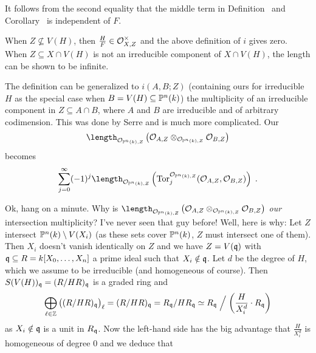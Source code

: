 \documentclass[a4paper,parskip=half,numbers=enddot, DIV=12, headheight=30pt]{scrreprt}
\begin{document}
\begin{rem}
    \begin{alphanumerate}
    \item {}
        It follows from the second equality that the middle term in Definition~ and Corollary~ is independent of $F$.
    \item 
        When $Z\not\subseteq V(H)$, then $\frac{H}{F}\in \mathcal{O}_{X,Z}^\times$ and the above definition of $i$ gives zero. When $Z\subseteq X\cap V(H)$ is not an irreducible component of $X\cap V(H)$, the length can be shown to be infinite.
    \item 
        The definition can be generalized to $i(A,B;Z)$ (containing ours for irreducible $H$ as the special case when $B=V(H)\subseteq \mathbb{P}^n(k)$) the multiplicity of an irreducible component in $Z\subseteq A\cap B$, where $A$ and $B$ are irreducible and of arbitrary codimension. This was done by Serre and is much more complicated. Our
        \begin{align*}
            \length_{\Oo_{\IP^n(k), Z}}\left(\Oo_{A,Z}\otimes_{\Oo_{\IP^n(k), Z}} \Oo_{B,Z} \right)
        \end{align*}
        becomes
        \begin{align*}
            \sum_{j=0}^\infty (-1)^j \length_{\Oo_{\IP^n(k), Z}}\left(\operatorname{Tor}_j^{\Oo_{\IP^n(k), Z}}(\Oo_{A,Z},\Oo_{B,Z})\right)\;.
        \end{align*}
        \item Ok, hang on a minute. Why is $\length_{\Oo_{\IP^n(k), Z}}\left(\Oo_{A,Z}\otimes_{\Oo_{\IP^n(k), Z}} \Oo_{B,Z} \right)$ \emph{our} intersection multiplicity? I've never seen that guy before! Well, here is why: Let $Z$ intersect $\mathbb{P}^n(k)\setminus V(X_i)$ (as these sets cover $\mathbb{P}^n(k)$, $Z$ must intersect one of them). Then $X_i$ doesn't vanish identically on $Z$ and we have $Z=V(\mathfrak{q})$ with $\mathfrak{q}\subseteq R=k[X_0,\ldots,X_n]$ a prime ideal such that $X_i\notin\mathfrak{q}$. Let $d$ be the degree of $H$, which we assume to be irreducible (and homogeneous of course). Then $S(V(H))_{\mathfrak{q}}=(R/HR)_{\mathfrak{q}}$ is a graded ring and
        \begin{align*}
        	\bigoplus_{\ell\in\mathbb{Z}}\big((R/HR)_{\mathfrak{q}}\big)_\ell=(R/HR)_{\mathfrak{q}}=R_{\mathfrak{q}}/H R_{\mathfrak{q}}\simeq R_{\mathfrak{q}}\Bigm/\left(\frac{H}{X_i^d}\cdot R_{\mathfrak{q}}\right)
        \end{align*}
        as $X_i\notin\mathfrak{q}$ is a unit in $R_{\mathfrak{q}}$. Now the left-hand side has the big advantage that $\frac{H}{X_i^d}$ is homogeneous of degree $0$ and we deduce that 

\end{alphanumerate}
\end{rem}
\end{document}
